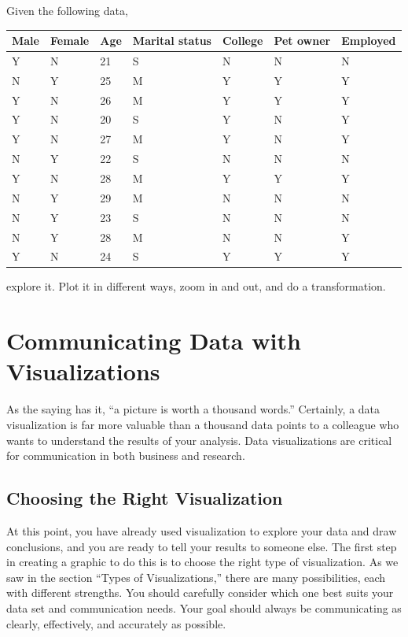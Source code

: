 \begin{problem}
Given the following data, 

\begin{tabular}{| l | l | l | l | l | l | l |}
\hline
Male & Female & Age & Marital status & College & Pet owner & Employed \\
\hline
Y & N & 21 & S &  N & N & N \\
N & Y & 25 & M & Y & Y & Y\\
Y & N & 26 & M & Y & Y & Y\\
Y & N & 20 & S & Y & N & Y\\
Y & N & 27 & M & Y & N & Y\\
N & Y & 22 & S & N & N & N\\
Y & N & 28 & M & Y & Y & Y\\
N & Y & 29 & M &  N & N & N\\
N & Y & 23 & S &  N & N & N\\
N & Y & 28 & M & N & N & Y\\
Y & N &  24 & S & Y & Y & Y\\
\hline
\end{tabular}

explore it. Plot it in different ways, zoom in and out, and do a transformation.
\end{problem}



\section*{Communicating Data with Visualizations}

As the saying has it, ``a picture is worth a thousand words.'' 
Certainly, a data visualization is far more valuable than a thousand data points to a colleague who wants to understand the results of your analysis. 
Data visualizations are critical for communication in both business and research.

\subsection*{Choosing the Right Visualization}
At this point, you have already used visualization to explore your data and draw conclusions, and you are ready to tell your results to someone else. 
The first step in creating a graphic to do this is to choose the right type of visualization. 
As we saw in the section ``Types of Visualizations,'' there are many possibilities, each with different strengths. 
You should carefully consider which one best suits your data set and communication needs.  Your goal should always be communicating as clearly, effectively, and accurately as possible.  

